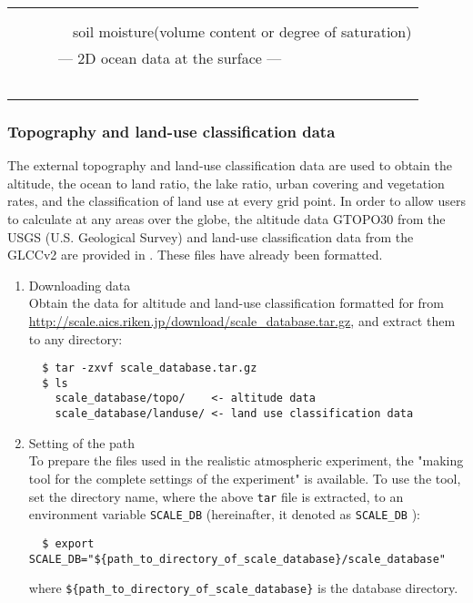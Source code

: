 \begin{table}[tb]
\begin{center}
\begin{tabularx}{150mm}{llX}
    & &  \multicolumn{1}{l}{\color{blue}{surface skin temperature}}\\
    & &  \multicolumn{1}{l}{{\color{blue}{information of depth of soil data in the parent model, soil temperature,}}}\\
    & &  \multicolumn{1}{l}{{{soil moisture(volume content or degree of saturation)}}}\\
    &  \multicolumn{2}{l}{--- 2D ocean data at the surface ---}\\
　　& &  \multicolumn{1}{l}{\color{blue}{sea surface temperature (omitted if skin temperature is also used for SST)}}\\ \hline
  \end{tabularx}
\end{center}
\end{table}


\subsubsection{Topography and land-use classification data}

The external topography and land-use classification data are used to obtain the altitude, the ocean to land ratio,
the lake ratio, urban covering and vegetation rates, and the classification of land use at every grid point.
In order to allow users to calculate at any areas over the globe,
the altitude data GTOPO30 from the USGS (U.S. Geological Survey)
and land-use classification data from the GLCCv2 are provided in \scalerm.
These files have already been formatted. 
\begin{enumerate}
\item Downloading data\\
Obtain the data for altitude and land-use classification formatted for \scalerm  from \url{http://scale.aics.riken.jp/download/scale_database.tar.gz}, and extract them to any directory:
\begin{verbatim}
  $ tar -zxvf scale_database.tar.gz
  $ ls
    scale_database/topo/    <- altitude data
    scale_database/landuse/ <- land use classification data
\end{verbatim}
\item Setting of the path\\
To prepare the files used in the realistic atmospheric experiment,
the "making tool for the complete settings of the experiment" is available.
To use the tool, set the directory name, where the above \verb|tar| file is extracted,
to an environment variable \verb|SCALE_DB| (hereinafter, it denoted as \verb|SCALE_DB| ):
\begin{verbatim}
  $ export SCALE_DB="${path_to_directory_of_scale_database}/scale_database"
\end{verbatim}
where \verb|${path_to_directory_of_scale_database}| is the database directory. 

\end{enumerate}


